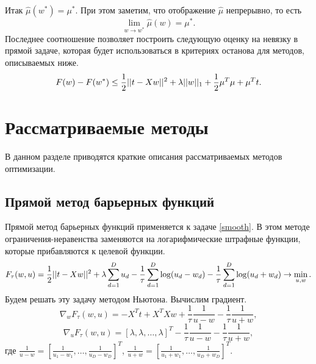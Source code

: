 \documentclass[12pt]{article}
\begin{document}
		Итак $\hat\mu(w^*) = \mu^*$. При этом заметим, что отображение $\hat\mu$ непрерывно, то есть
		$$\lim_{w \rightarrow w^*} \hat\mu(w) = \mu^*.$$
		Последнее соотношение позволяет построить следующую оценку на невязку в прямой задаче, которая будет использоваться в критериях останова для методов, описываемых ниже.
		\begin{equation}\label{estimate}
		F(w) - F(w^*) \le \frac 1 2 ||t - X w||^2 + \lambda ||w||_1 + \frac 1 2 \mu^T \mu + \mu^T t.
		\end{equation}

		
\pagebreak
\section{Рассматриваемые методы}
	В данном разделе приводятся краткие описания рассматриваемых методов оптимизации.
	
	\subsection{Прямой метод барьерных функций}
		Прямой метод барьерных функций применяется к задаче \ref{smooth}. В этом методе ограничения-неравенства заменяются на логарифмические штрафные функции, которые прибавляются к целевой функции.
		\begin{equation}\label{primal_loss}
		F_\tau (w, u) = \frac 1 2 ||t - Xw||^2 + \lambda \sum\limits_{d = 1}^D u_d - \frac 1 \tau \sum_{d=1}^D \log(u_d - w_d) - \frac 1 \tau \sum_{d=1}^D \log(u_d + w_d) \rightarrow \min_{u, w}.
		\end{equation}
		Будем решать эту задачу методом Ньютона. Вычислим градиент.
		$$\nabla_w F_\tau(w, u) = - X^T t + X^T X w + \frac 1 \tau \frac 1 {u - w} - \frac 1 \tau \frac 1 {u + w},$$
		$$\nabla_u F_\tau(w, u) = [\lambda, \lambda, \ldots, \lambda]^T - \frac 1 \tau \frac 1 {u - w} - \frac 1 \tau \frac 1 {u + w},$$
		где $\frac 1 {u - w} = \left[\frac 1 {u_1 - w_1}, \ldots, \frac 1 {u_D - w_D}\right]^T$, $\frac 1 {u + w} = \left[\frac 1 {u_1 + w_1}, \ldots, \frac 1 {u_D + w_D}\right]^T$.
		
\end{document}
